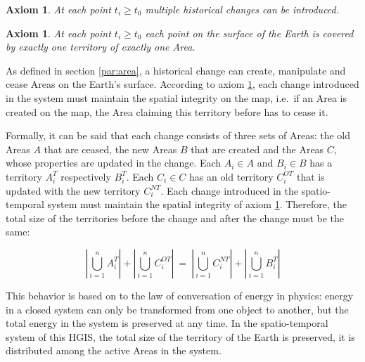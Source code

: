 \vspace{-2.0em}
\newtheorem{historical_change}[assicounter]{Axiom}
\begin{historical_change}
\label{axm:historical_change}
  At each point $t_i \geq t_0$ multiple historical changes can be introduced.
\end{historical_change}

\vspace{-2.0em}
\newtheorem{unique_coverage}[assicounter]{Axiom}
\begin{unique_coverage}
\label{axm:unique_coverage}
  At each point $t_i \geq t_0$ each point on the surface of the Earth is covered by exactly one territory of exactly one Area.
\end{unique_coverage}

As defined in section \ref{par:area}, a historical change can create, manipulate and cease Areas on the Earth's surface. According to axiom \ref{axm:unique_coverage}, each change introduced in the system must maintain the spatial integrity on the map, i.e.\ if an Area is created on the map, the Area claiming this territory before has to cease it.

Formally, it can be said that each change consists of three sets of Areas: the old Areas $A$ that are ceased, the new Areas $B$ that are created and the Areas $C$, whose properties are updated in the change. Each $A_i \in A$ and $B_i \in B$ has a territory $A_i^T$ respectively $B_i^T$. Each $C_i \in C$ has an old territory $C_i^{OT}$ that is updated with the new territory $C_i^{NT}$. Each change introduced in the spatio-temporal system must maintain the spatial integrity of axiom \ref{axm:unique_coverage}. Therefore, the total size of the territories before the change and after the change must be the same:

\vspace{-.5em}

\[
  \left|\bigcup\limits_{i=1}^n A_i^T\right|
  +
  \left|\bigcup\limits_{i=1}^n C_i^{OT}\right|
  ~=~
  \left|\bigcup\limits_{i=1}^n C_i^{NT}\right|
  +
  \left|\bigcup\limits_{i=1}^n B_i^T\right|
\]

\vspace{.5em}

This behavior is based on to the law of conversation of energy in physics: energy in a closed system can only be transformed from one object to another, but the total energy in the system is preserved at any time. In the spatio-temporal system of this HGIS, the total size of the territory of the Earth is preserved, it is distributed among the active Areas in the system.

